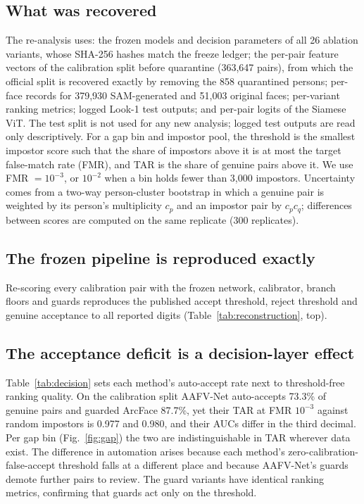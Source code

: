 \documentclass[journal]{IEEEtran}
\begin{document}
\subsection{What was recovered}
The re-analysis uses: the frozen models and decision parameters of all 26 ablation variants, whose SHA-256 hashes match the freeze ledger; the per-pair feature vectors of the calibration split before quarantine (363,647 pairs), from which the official split is recovered exactly by removing the 858 quarantined persons; per-face records for 379,930 SAM-generated and 51,003 original faces; per-variant ranking metrics; logged Look-1 test outputs; and per-pair logits of the Siamese ViT. The test split is not used for any new analysis; logged test outputs are read only descriptively. For a gap bin and impostor pool, the threshold is the smallest impostor score such that the share of impostors above it is at most the target false-match rate (FMR), and TAR is the share of genuine pairs above it. We use FMR $=10^{-3}$, or $10^{-2}$ when a bin holds fewer than 3,000 impostors. Uncertainty comes from a two-way person-cluster bootstrap in which a genuine pair is weighted by its person's multiplicity $c_p$ and an impostor pair by $c_pc_q$; differences between scores are computed on the same replicate (300 replicates).

\subsection{The frozen pipeline is reproduced exactly}
\label{sec:recon}
Re-scoring every calibration pair with the frozen network, calibrator, branch floors and guards reproduces the published accept threshold, reject threshold and genuine acceptance to all reported digits (Table~\ref{tab:reconstruction}, top).



\subsection{The acceptance deficit is a decision-layer effect}
\label{sec:decision}
Table~\ref{tab:decision} sets each method's auto-accept rate next to threshold-free ranking quality. On the calibration split AAFV-Net auto-accepts 73.3\% of genuine pairs and guarded ArcFace 87.7\%, yet their TAR at FMR $10^{-3}$ against random impostors is 0.977 and 0.980, and their AUCs differ in the third decimal. Per gap bin (Fig.~\ref{fig:gap}) the two are indistinguishable in TAR wherever data exist. The difference in automation arises because each method's zero-calibration-false-accept threshold falls at a different place and because AAFV-Net's guards demote further pairs to review. The guard variants have identical ranking metrics, confirming that guards act only on the threshold.
\end{document}
